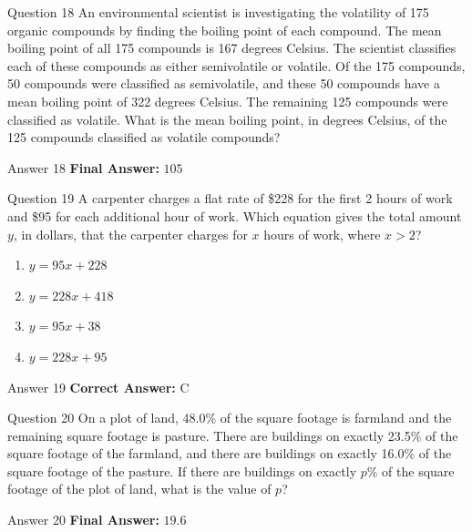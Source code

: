 \documentclass{beamer}
\begin{document}
\begin{frame}{Question 18}
\small
An environmental scientist is investigating the volatility of 175 organic compounds by finding the boiling point of each compound.  
The mean boiling point of all 175 compounds is 167 degrees Celsius.  
The scientist classifies each of these compounds as either semivolatile or volatile.  
Of the 175 compounds, 50 compounds were classified as semivolatile, and these 50 compounds have a mean boiling point of 322 degrees Celsius.  
The remaining 125 compounds were classified as volatile.  
What is the mean boiling point, in degrees Celsius, of the 125 compounds classified as volatile compounds?
\end{frame}
\begin{frame}{Answer 18}
\small
\textbf{Final Answer:} $\boxed{105}$
\end{frame}

\begin{frame}{Question 19}
\small
A carpenter charges a flat rate of \$228 for the first 2 hours of work and \$95 for each additional hour of work.  
Which equation gives the total amount $y$, in dollars, that the carpenter charges for $x$ hours of work, where $x > 2$?
\vspace{0.35cm}
\begin{enumerate}
    \item[A.] $y = 95x + 228$
    \item[B.] $y = 228x + 418$
    \item[C.] $y = 95x + 38$
    \item[D.] $y = 228x + 95$
\end{enumerate}
\end{frame}
\begin{frame}{Answer 19}
\small
\textbf{Correct Answer:} C
\end{frame}

\begin{frame}{Question 20}
\small
On a plot of land, 48.0\% of the square footage is farmland and the remaining square footage is pasture.  
There are buildings on exactly 23.5\% of the square footage of the farmland, and there are buildings on exactly 16.0\% of the square footage of the pasture.  
If there are buildings on exactly $p\%$ of the square footage of the plot of land, what is the value of $p$?
\end{frame}
\begin{frame}{Answer 20}
\small
\textbf{Final Answer:} $\boxed{19.6}$
\end{frame}
\end{document}
